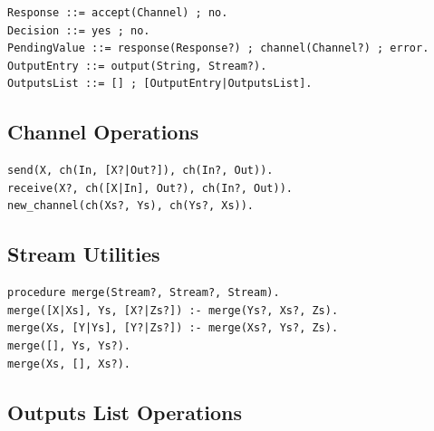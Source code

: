 \begin{verbatim}
Response ::= accept(Channel) ; no.
Decision ::= yes ; no.
PendingValue ::= response(Response?) ; channel(Channel?) ; error.
OutputEntry ::= output(String, Stream?).
OutputsList ::= [] ; [OutputEntry|OutputsList].
\end{verbatim}

\subsection{Channel Operations}
\label{app:channel-ops}

\begin{verbatim}
send(X, ch(In, [X?|Out?]), ch(In?, Out)).
receive(X?, ch([X|In], Out?), ch(In?, Out)).
new_channel(ch(Xs?, Ys), ch(Ys?, Xs)).
\end{verbatim}

\subsection{Stream Utilities}
\label{app:stream-utils}

\begin{verbatim}
procedure merge(Stream?, Stream?, Stream).
merge([X|Xs], Ys, [X?|Zs?]) :- merge(Ys?, Xs?, Zs).
merge(Xs, [Y|Ys], [Y?|Zs?]) :- merge(Xs?, Ys?, Zs).
merge([], Ys, Ys?).
merge(Xs, [], Xs?).
\end{verbatim}

\subsection{Outputs List Operations}
\label{app:outputs-ops}

